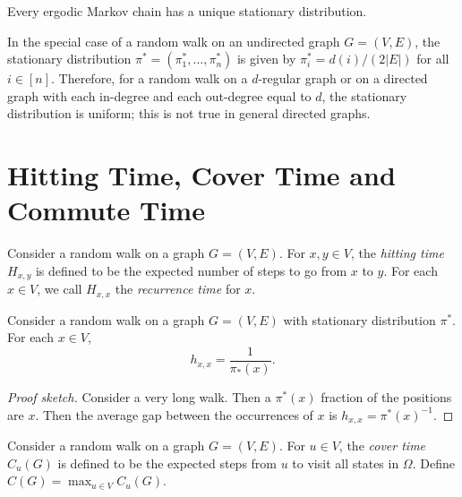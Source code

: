 \documentclass[letterpaper, reqno,11pt]{article}
\begin{document}
\begin{theorem}
  Every ergodic Markov chain has a unique stationary distribution.
\end{theorem}

In the special case of a random walk on an undirected graph $G = (V, E)$, the stationary distribution $\pi^* = (\pi_1^*, \ldots, \pi_n^*)$ is given by $\pi_i^* = d(i)/(2|E|)$ for all $i \in [n]$. Therefore, for a random walk on a $d$-regular graph or on a directed graph with each in-degree and each out-degree equal to $d$, the stationary distribution is uniform; this is not true in general directed graphs.

\section{Hitting Time, Cover Time and Commute Time}

\begin{definition}
  Consider a random walk on a graph $G = (V, E)$. For $x, y \in V$, the \emph{hitting time} $H_{x, y}$ is defined to be the expected number of steps to go from $x$ to $y$. For each $x \in V$, we call $H_{x, x}$ the \emph{recurrence time} for $x$.
\end{definition}

\begin{theorem}
  Consider a random walk on a graph $G = (V, E)$ with stationary distribution $\pi^*$. For each $x \in V$,
  $$ h_{x, x} = \frac{1}{\pi_*(x)}. $$
\end{theorem}

\begin{proof}[Proof sketch]
  Consider a very long walk. Then a $\pi^*(x)$ fraction of the positions are $x$. Then the average gap between the occurrences of $x$ is $h_{x, x} = \pi^*(x)^{-1}$.
\end{proof}

\begin{definition}
  Consider a random walk on a graph $G = (V, E)$. For $u \in V$, the \emph{cover time} $C_u(G)$ is defined to be the expected steps from $u$ to visit all states in $\Omega$. Define $C(G) = \max_{u \in V} C_u(G)$.
\end{definition}
\end{document}

